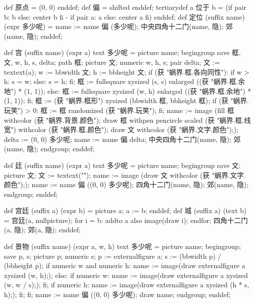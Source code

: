 \startMPinclusions[+]
def 原点 = (0, 0) enddef;
def 偏 = shifted enddef;
tertiarydef a 位于 b =
  (if pair b: b else: center b fi - if pair a: a else: center a fi)
enddef;
def 定位 (suffix name) (expr 多少呢) =
  name := name 偏 (多少呢);
  中央四角十二门(name, 隐); 郊(name, 隐);
enddef;
\stopMPinclusions

\startMPinclusions[+]
def 宫 (suffix name) (expr a) text 多少呢 =
  picture name;
  begingroup
  save 框, 文, w, h, s, delta;
  path 框; picture 文; numeric w, h, s; pair delta;
  文 := textext(a);
  w := bbwidth 文; h := bbheight 文;
  if (获 "蜗界.框.各向同性"):
    if w > h: s = w; else: s = h; fi;
    框 := fullsquare xysized (s, s) enlarged ((获 "蜗界.框.余地") * (1, 1));
  else:
    框 := fullsquare xysized (w, h) enlarged ((获 "蜗界.框.余地") * (1, 1));
  fi;
  框 := (获 "蜗界.框形") xysized (bbwidth 框, bbheight 框);
  if (获 "蜗界.玩笑") > 0: 框 := 框 randomized (获 "蜗界.玩笑"); fi;
  name := image (fill 框 withcolor (获 "蜗界.背景.颜色");
                 draw 框 withpen pencircle scaled (获 "蜗界.框.线宽")
                         withcolor (获 "蜗界.框.颜色");
                 draw 文 withcolor (获 "蜗界.文字.颜色"););
  delta := (0, 0) 多少呢;
  name := name 偏 delta;
  中央四角十二门(name, 隐); 郊(name, 隐);
  endgroup;
enddef;
\stopMPinclusions

\startMPinclusions[+]
def 廷 (suffix name) (expr a) text 多少呢 =
  picture name;
  begingroup
    save 文; picture 文; 文 := textext("");
    name := image (draw 文 withcolor (获 "蜗界.文字.颜色"););
    name := name 偏 ((0, 0) 多少呢); 四角十二门(name, 隐); 郊(name, 隐);
  endgroup;
enddef;
\stopMPinclusions

\startMPinclusions[+]
def 宫廷 (suffix a) (expr b) = picture a; a := b; enddef;
def 城 (suffix a) (text b) =
  宫廷(a, nullpicture);
  for i = b: addto a also image(draw i); endfor;
  四角十二门(a, 隐); 郊(a, 隐);
enddef;
\stopMPinclusions

\startMPinclusions[+]
def 景物 (suffix name) (expr a, w, h) text 多少呢 =
  picture name;
  begingroup;
  save p, s; picture p; numeric s;
  p := externalfigure a;
  s := (bbwidth p) / (bbheight p);
  if numeric w and numeric h:
    name := image(draw externalfigure a xysized (w, h););
  else:
    if numeric w:
      name := image(draw externalfigure a xysized (w, w / s););
    fi;
    if numeric h:
       name := image(draw externalfigure a xysized (h * s, h););
    fi;
  fi;
  name := name 偏 ((0, 0) 多少呢); 
  draw name;  
  endgroup;
enddef;


